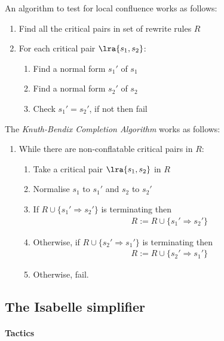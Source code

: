 \documentclass{article}
\begin{document}
\begin{theorem}
	An algorithm to test for local confluence works as follows:
	\begin{enumerate}
		\item Find all the critical pairs in set of rewrite rules $R$
		\item For each critical pair $\lra{s_1, s_2}$: \begin{enumerate}
			      \item Find a normal form $s_1'$ of $s_1$
			      \item Find a normal form $s_2'$ of $s_2$
			      \item Check $s_1'=s_2'$, if not then fail
		      \end{enumerate}
	\end{enumerate}
\end{theorem}

\begin{theorem}
	The \emph{Knuth-Bendix Completion Algorithm} works as follows:
	\begin{enumerate}
		\item While there are non-conflatable critical pairs in $R$: \begin{enumerate}
			      \item Take a critical pair $\lra{s_1, s_2}$ in $R$
			      \item Normalise $s_1$ to $s_1'$ and $s_2$ to $s_2'$
			      \item If $R\cup\{s_1'\Rightarrow s_2'\}$ is terminating then \begin{align*}
				            R := R \cup \{s_1'\Rightarrow s_2'\}
			            \end{align*}
			      \item Otherwise, if $R\cup\{s_2'\Rightarrow s_1'\}$ is terminating then \begin{align*}
				            R := R \cup \{s_2' \Rightarrow s_1'\}
			            \end{align*}
			      \item Otherwise, fail.
		      \end{enumerate}
	\end{enumerate}
\end{theorem}

\subsection{The Isabelle simplifier}

\paragraph*{Tactics}
\end{document}
